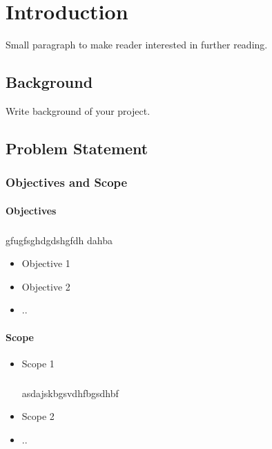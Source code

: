 \chapter{Introduction}%

Small paragraph to make reader interested in further reading. 

\section{Background}

Write background of your project.

\section{Problem Statement}

\subsection{Objectives and Scope}

\subsubsection{Objectives}
\paragraph{}
gfugfsghdgdshgfdh dahba 
\begin{itemize}
	\item Objective 1
	\item Objective 2
	\item ..
\end{itemize}

\subsubsection{Scope}
\begin{itemize}
	\item Scope 1
	\paragraph{}
	asdajskbgsvdhfbgsdhbf
	\item Scope 2
	\item ..
\end{itemize}

